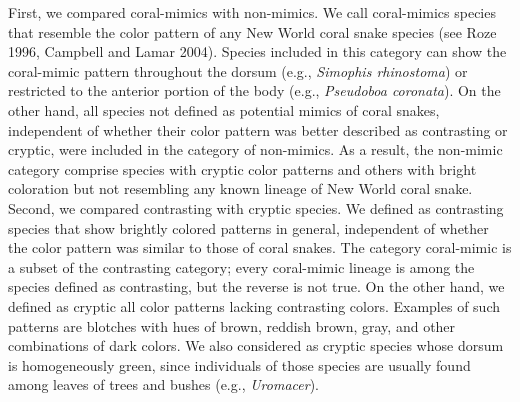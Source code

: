 First, we compared coral-mimics with non-mimics. We call coral-mimics species that resemble the color pattern of any New World coral snake species (see Roze 1996, Campbell and Lamar 2004). Species included in this category can show the coral-mimic pattern throughout the dorsum (e.g., \textit{Simophis rhinostoma}) or restricted to the anterior portion of the body (e.g., \textit{Pseudoboa coronata}). On the other hand, all species not defined as potential mimics of coral snakes, independent of whether their color pattern was better described as contrasting or cryptic, were included in the category of non-mimics. As a result, the non-mimic category comprise species with cryptic color patterns and others with bright coloration but not resembling any known lineage of New World coral snake. Second, we compared contrasting with cryptic species. We defined as contrasting species that show brightly colored patterns in general, independent of whether the color pattern was similar to those of coral snakes. The category coral-mimic is a subset of the contrasting category; every coral-mimic lineage is among the species defined as contrasting, but the reverse is not true. On the other hand, we defined as cryptic all color patterns lacking contrasting colors. Examples of such patterns are blotches with hues of brown, reddish brown, gray, and other combinations of dark colors. We also considered as cryptic species whose dorsum is homogeneously green, since individuals of those species are usually found among leaves of trees and bushes (e.g., \textit{Uromacer}).

